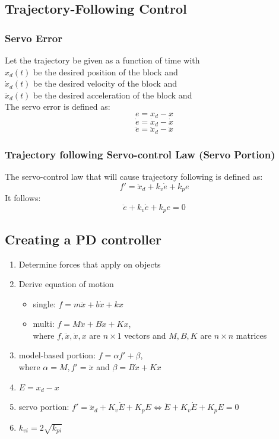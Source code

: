 \documentclass[10pt,a4paper]{article}
\begin{document}
\subsection{Trajectory-Following Control}
\subsubsection{Servo Error}
Let the trajectory be given as a function of time with\\
$x_d(t)$ be the desired position of the block and \\
$\dot x_d(t)$ be the desired velocity of the block and \\
$\ddot x_d(t)$ be the desired acceleration of the block and \\
The servo error is defined as:
$$
e = x_d - x
$$
$$
\dot e = \dot x_d - \dot x
$$
$$
\ddot e = \ddot x_d - \ddot x
$$

\subsubsection{Trajectory following Servo-control Law (Servo Portion)}
The servo-control law that will cause trajectory following is defined as:
$$
f' = \ddot x_d + k_v \dot e + k_p e
$$
It follows:
$$
\ddot e + k_v \dot e + k_p e = 0
$$

\subsection{Creating a PD controller}
\begin{enumerate}
	\item Determine forces that apply on objects
	\item Derive equation of motion
	\begin{itemize}
		\item single: $f = m \ddot x + b \dot x + k x$
		\item multi: $f = M \ddot x  + B \dot x + K x$, \\
		where $f, \ddot x, \dot x, x$ are $n \times  1$ vectors and $M, B, K$ are $n \times n$ matrices
	\end{itemize}
	\item model-based portion: $f = \alpha f' + \beta$, \\
	where $\alpha = M, f' = \ddot x$ and $\beta = B \dot x + K x$
	\item $E = x_d - x$
	\item servo portion: $f' = \ddot x_d + K_v \dot E + K_p E \iff \ddot E + K_v \dot E + K_p E = 0$
	\item $k_{vi} = 2 \sqrt{k_{pi}}$
\end{enumerate}
\end{document}

